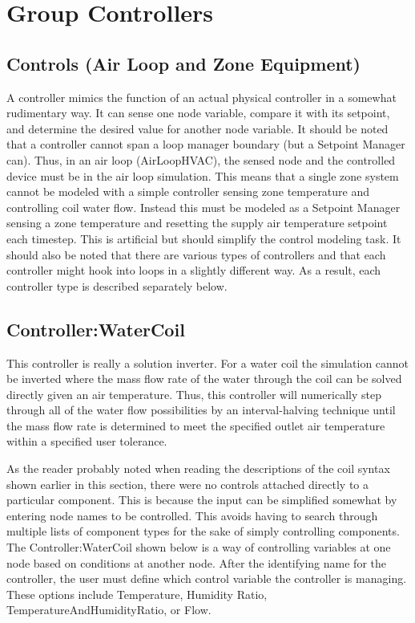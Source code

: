 \section{Group Controllers}\label{group-controllers}

\subsection{Controls (Air Loop and Zone Equipment)}\label{controls-air-loop-and-zone-equipment}

A controller mimics the function of an actual physical controller in a somewhat rudimentary way. It can sense one node variable, compare it with its setpoint, and determine the desired value for another node variable. It should be noted that a controller cannot span a loop manager boundary (but a Setpoint Manager can). Thus, in an air loop (AirLoopHVAC), the sensed node and the controlled device must be in the air loop simulation. This means that a single zone system cannot be modeled with a simple controller sensing zone temperature and controlling coil water flow. Instead this must be modeled as a Setpoint Manager sensing a zone temperature and resetting the supply air temperature setpoint each timestep. This is artificial but should simplify the control modeling task. It should also be noted that there are various types of controllers and that each controller might hook into loops in a slightly different way. As a result, each controller type is described separately below.

\subsection{Controller:WaterCoil}\label{controllerwatercoil}

This controller is really a solution inverter. For a water coil the simulation cannot be inverted where the mass flow rate of the water through the coil can be solved directly given an air temperature. Thus, this controller will numerically step through all of the water flow possibilities by an interval-halving technique until the mass flow rate is determined to meet the specified outlet air temperature within a specified user tolerance.

As the reader probably noted when reading the descriptions of the coil syntax shown earlier in this section, there were no controls attached directly to a particular component. This is because the input can be simplified somewhat by entering node names to be controlled. This avoids having to search through multiple lists of component types for the sake of simply controlling components. The Controller:WaterCoil shown below is a way of controlling variables at one node based on conditions at another node. After the identifying name for the controller, the user must define which control variable the controller is managing. These options include Temperature, Humidity Ratio, TemperatureAndHumidityRatio, or Flow.

